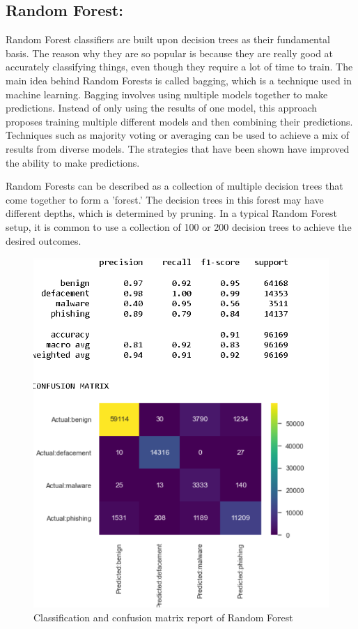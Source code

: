 \subsection{Random Forest:}



Random Forest classifiers are built upon decision trees as their fundamental basis. The reason why they are so popular is because they are really good at accurately classifying things, even though they require a lot of time to train. The main idea behind Random Forests is called bagging, which is a technique used in machine learning. Bagging involves using multiple models together to make predictions. Instead of only using the results of one model, this approach proposes training multiple different models and then combining their predictions. Techniques such as majority voting or averaging can be used to achieve a mix of results from diverse models. The strategies that have been shown have improved the ability to make predictions.

Random Forests can be described as a collection of multiple decision trees that come together to form a 'forest.' The decision trees in this forest may have different depths, which is determined by pruning. In a typical Random Forest setup, it is common to use a collection of 100 or 200 decision trees to achieve the desired outcomes.

\begin{figure}[h]
\centering
\centerline{\includegraphics[width=1\textwidth]{RFclassification.png}}
\caption{Classification and confusion matrix report of Random Forest}
\label{Claaification Report of RF }
\end{figure}



